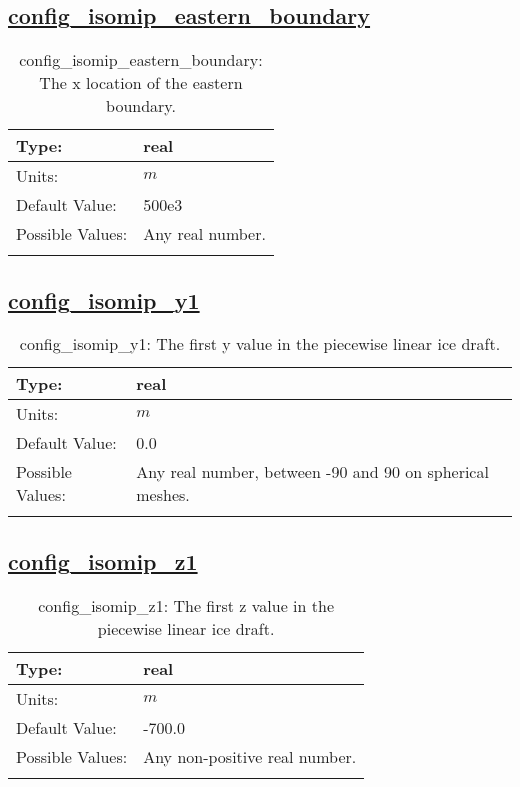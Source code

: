 \subsection[config\_isomip\_eastern\_boundary]{\hyperref[sec:nm_tab_isomip]{config\_isomip\_eastern\_boundary}}
\label{subsec:nm_sec_config_isomip_eastern_boundary}
\begin{center}
\begin{longtable}{| p{2.0in} || p{4.0in} |}
    \hline
    Type: & real \\
    \hline
    Units: & $m$ \\
    \hline
    Default Value: & 500e3 \\
    \hline
    Possible Values: & Any real number. \\
    \hline
    \caption{config\_isomip\_eastern\_boundary: The x location of the eastern boundary.}
\end{longtable}
\end{center}
\subsection[config\_isomip\_y1]{\hyperref[sec:nm_tab_isomip]{config\_isomip\_y1}}
\label{subsec:nm_sec_config_isomip_y1}
\begin{center}
\begin{longtable}{| p{2.0in} || p{4.0in} |}
    \hline
    Type: & real \\
    \hline
    Units: & $m$ \\
    \hline
    Default Value: & 0.0 \\
    \hline
    Possible Values: & Any real number, between -90 and 90 on spherical meshes. \\
    \hline
    \caption{config\_isomip\_y1: The first y value in the piecewise linear ice draft.}
\end{longtable}
\end{center}
\subsection[config\_isomip\_z1]{\hyperref[sec:nm_tab_isomip]{config\_isomip\_z1}}
\label{subsec:nm_sec_config_isomip_z1}
\begin{center}
\begin{longtable}{| p{2.0in} || p{4.0in} |}
    \hline
    Type: & real \\
    \hline
    Units: & $m$ \\
    \hline
    Default Value: & -700.0 \\
    \hline
    Possible Values: & Any non-positive real number. \\
    \hline
    \caption{config\_isomip\_z1: The first z value in the piecewise linear ice draft.}
\end{longtable}
\end{center}
